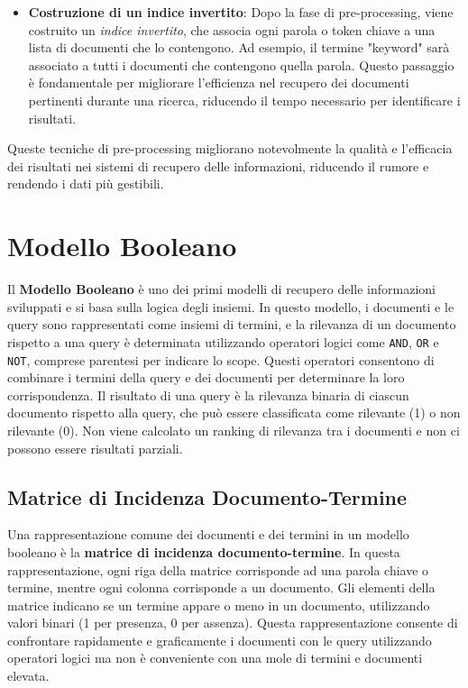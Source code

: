 \documentclass{report}
\begin{document}
\begin{itemize}
		\item \textbf{Costruzione di un indice invertito}: Dopo la fase di pre-processing, viene costruito un \emph{indice invertito}, che associa ogni parola o token chiave a una lista di documenti che lo contengono. Ad esempio, il termine "keyword" sarà associato a tutti i documenti che contengono quella parola. Questo passaggio è fondamentale per migliorare l'efficienza nel recupero dei documenti pertinenti durante una ricerca, riducendo il tempo necessario per identificare i risultati.
	\end{itemize}

	Queste tecniche di pre-processing migliorano notevolmente la qualità e l'efficacia dei risultati nei sistemi di recupero delle informazioni, riducendo il rumore e rendendo i dati più gestibili.

	\section{Modello Booleano}
	Il \textbf{Modello Booleano} è uno dei primi modelli di recupero delle informazioni sviluppati e si basa sulla logica degli insiemi. In questo modello, i documenti e le query sono rappresentati come insiemi di termini, e la rilevanza di un documento rispetto a una query è determinata utilizzando operatori logici come \texttt{AND}, \texttt{OR} e \texttt{NOT}, comprese parentesi per indicare lo scope. Questi operatori consentono di combinare i termini della query e dei documenti per determinare la loro corrispondenza. Il risultato di una query è la rilevanza binaria di ciascun documento rispetto alla query, che può essere classificata come rilevante (1) o non rilevante (0). Non viene calcolato un ranking di rilevanza tra i documenti e non ci possono essere risultati parziali.

	\subsection{Matrice di Incidenza Documento-Termine}
	Una rappresentazione comune dei documenti e dei termini in un modello booleano è la \textbf{matrice di incidenza documento-termine}. In questa rappresentazione, ogni riga della matrice corrisponde ad una parola chiave o termine, mentre ogni colonna corrisponde a un documento. Gli elementi della matrice indicano se un termine appare o meno in un documento, utilizzando valori binari (1 per presenza, 0 per assenza). Questa rappresentazione consente di confrontare rapidamente e graficamente i documenti con le query utilizzando operatori logici ma non è conveniente con una mole di termini e documenti elevata.
\end{document}
